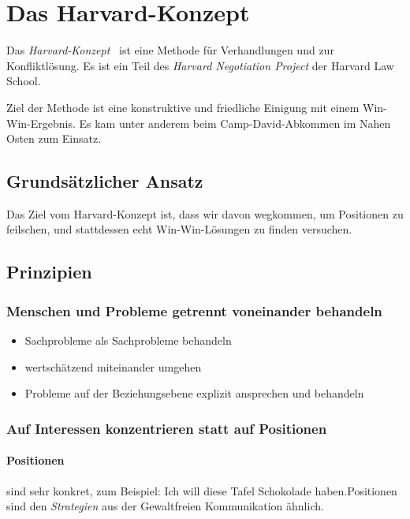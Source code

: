 \section{Das Harvard-Konzept}
\label{harvard-konzept}

Das \emph{Harvard-Konzept}~\cite{harvard-konzept} ist eine Methode für Verhandlungen und zur Konfliktlösung. Es ist ein Teil des \emph{Harvard Negotiation Project} der Harvard Law School.

Ziel der Methode ist eine konstruktive und friedliche Einigung mit einem Win-Win-Ergebnis. Es kam unter anderem beim Camp-David-Abkommen im Nahen Osten zum Einsatz.

\subsection{Grundsätzlicher Ansatz}

Das Ziel vom Harvard-Konzept ist, dass wir davon wegkommen, um Positionen zu feilschen, und stattdessen echt Win-Win-Lösungen zu finden versuchen.


\subsection{Prinzipien}


\subsubsection{Menschen und Probleme getrennt voneinander behandeln}

\begin{itemize}
  \item Sachprobleme als Sachprobleme behandeln
  \item wertschätzend miteinander umgehen
  \item Probleme auf der Beziehungsebene explizit ansprechen und behandeln
\end{itemize}


\subsubsection{Auf Interessen konzentrieren statt auf Positionen}

\paragraph{Positionen} sind sehr konkret, zum Beispiel: \glqq Ich will diese Tafel Schokolade haben.\grqq Positionen sind den \emph{Strategien} aus der Gewaltfreien Kommunikation ähnlich.

